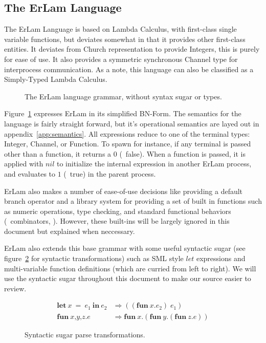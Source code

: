 \subsection{The ErLam Language}\label{sec:the erlam language}

The ErLam Language is based on Lambda Calculus, with first-class single 
variable functions, but deviates somewhat in that it provides other first-class 
entities. It deviates from Church representation to provide Integers, this is
purely for ease of use. It also provides a symmetric synchronous Channel type 
for interprocess communication. As a note, this language can also be classified 
as a Simply-Typed Lambda Calculus.

\begin{figure} %
\centering
{\footnotesize
    
}
\caption{The ErLam language grammar, without syntax sugar or types.}
\label{fig:grammer}
\end{figure}

Figure~\ref{fig:grammer} expresses ErLam in its simplified BN-Form. The 
semantics for the language is fairly straight forward, but it's operational 
semantics are layed out in appendix~\ref{app:semantics}. All expressions reduce
to one of the terminal types: Integer, Channel, or Function. To spawn for 
instance, if any terminal is passed other than a function, it returns a $0$
(\eg~false). When a function is passed, it is applied with $nil$ to 
initialize the internal expression in another ErLam process, and evaluates to $1$ (\eg~true) in the parent process.

ErLam also makes a number of ease-of-use decisions like providing a default 
branch operator and a library system for providing a set of built in functions 
such as numeric operations, type checking, and standard functional behaviors 
(\eg~combinators, \etc). However, these built-ins will be largely ignored in 
this document but explained when neccessary. 

ErLam also extends this base grammar with some useful syntactic sugar (see 
figure~\ref{fig:sugar-transform} for syntactic transformations) such as SML 
style $let$ expressions and multi-variable function definitions (which are 
curried from left to right). We will use the syntactic sugar throughout this 
document to make our source easier to review.

\begin{figure}
    \centering
    \begin{align*}
        \textbf{let}\: x\: =\: e_1\: \textbf{in}\: e_2
        & \Rightarrow
        ((\textbf{fun}\: x.e_2)\; e_1) \\
% 
        \textbf{fun}\: \textit{x,y,z} . \textit{e}
        & \Rightarrow
        \textbf{fun}\: \textit{x} . (\textbf{fun}\: \textit{y} . (\textbf{fun}\: \textit{z} . \textit{e} ))
    \end{align*}
    \caption{Syntactic sugar parse transformations.}
    \label{fig:sugar-transform}
\end{figure}

